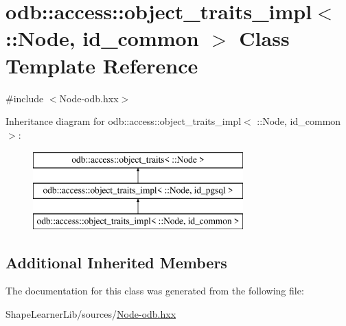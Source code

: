 \hypertarget{classodb_1_1access_1_1object__traits__impl_3_01_1_1_node_00_01id__common_01_4}{}\section{odb\+:\+:access\+:\+:object\+\_\+traits\+\_\+impl$<$ \+:\+:Node, id\+\_\+common $>$ Class Template Reference}
\label{classodb_1_1access_1_1object__traits__impl_3_01_1_1_node_00_01id__common_01_4}


{\ttfamily \#include $<$Node-\/odb.\+hxx$>$}

Inheritance diagram for odb\+:\+:access\+:\+:object\+\_\+traits\+\_\+impl$<$ \+:\+:Node, id\+\_\+common $>$\+:\begin{figure}[H]
\begin{center}
\leavevmode
\includegraphics[height=3.000000cm]{d2/d06/classodb_1_1access_1_1object__traits__impl_3_01_1_1_node_00_01id__common_01_4}
\end{center}
\end{figure}
\subsection*{Additional Inherited Members}


The documentation for this class was generated from the following file\+:\begin{DoxyCompactItemize}
\item 
Shape\+Learner\+Lib/sources/\hyperlink{_node-odb_8hxx}{Node-\/odb.\+hxx}\end{DoxyCompactItemize}

